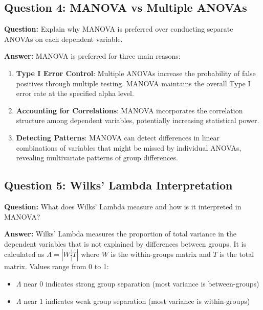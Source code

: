 \documentclass[
]{article}
\begin{document}
\textbf{ }

\subsection{Question 4: MANOVA vs Multiple ANOVAs}

\textbf{Question:} Explain why MANOVA is preferred over conducting
separate ANOVAs on each dependent variable.

\textbf{Answer:} MANOVA is preferred for three main reasons:

\begin{enumerate}
\item
  \textbf{Type I Error Control}: Multiple ANOVAs increase the
  probability of false positives through multiple testing. MANOVA
  maintains the overall Type I error rate at the specified alpha level.
\item
  \textbf{Accounting for Correlations}: MANOVA incorporates the
  correlation structure among dependent variables, potentially
  increasing statistical power.
\item
  \textbf{Detecting Patterns}: MANOVA can detect differences in linear
  combinations of variables that might be missed by individual ANOVAs,
  revealing multivariate patterns of group differences.
\end{enumerate}

\textbf{ }

\subsection{Question 5: Wilks' Lambda Interpretation}

\textbf{Question:} What does Wilks' Lambda measure and how is it
interpreted in MANOVA?

\textbf{Answer:} Wilks' Lambda measures the proportion of total variance
in the dependent variables that is not explained by differences between
groups. It is calculated as \(\Lambda = |W\frac{|}{|}T|\) where \(W\) is
the within-groups matrix and \(T\) is the total matrix. Values range
from 0 to 1:

\begin{itemize}
\item
  \(\Lambda\) near 0 indicates strong group separation (most variance is
  between-groups)
\item
  \(\Lambda\) near 1 indicates weak group separation (most variance is
  within-groups)
\end{itemize}
\end{document}
